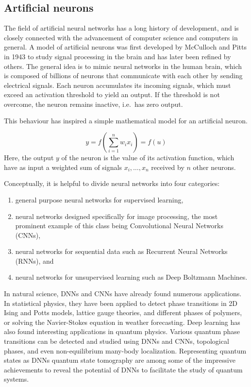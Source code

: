\documentclass[%
oneside,                 %
final,                   %
10pt]{article}
\begin{document}
\subsection*{Artificial neurons}

The field of artificial neural networks has a long history of
development, and is closely connected with the advancement of computer
science and computers in general. A model of artificial neurons was
first developed by McCulloch and Pitts in 1943 to study signal
processing in the brain and has later been refined by others. The
general idea is to mimic neural networks in the human brain, which is
composed of billions of neurons that communicate with each other by
sending electrical signals.  Each neuron accumulates its incoming
signals, which must exceed an activation threshold to yield an
output. If the threshold is not overcome, the neuron remains inactive,
i.e.~has zero output.

This behaviour has inspired a simple mathematical model for an artificial neuron.

\begin{equation}
 y = f\left(\sum_{i=1}^n w_ix_i\right) = f(u)
 \label{artificialNeuron}
\end{equation}
Here, the output $y$ of the neuron is the value of its activation function, which have as input
a weighted sum of signals $x_i, \dots ,x_n$ received by $n$ other neurons.

Conceptually, it is helpful to divide neural networks into four
categories:
\begin{enumerate}
\item general purpose neural networks for supervised learning,

\item neural networks designed specifically for image processing, the most prominent example of this class being Convolutional Neural Networks (CNNs),

\item neural networks for sequential data such as Recurrent Neural Networks (RNNs), and

\item neural networks for unsupervised learning such as Deep Boltzmann Machines.
\end{enumerate}

\noindent
In natural science, DNNs and CNNs have already found numerous
applications. In statistical physics, they have been applied to detect
phase transitions in 2D Ising and Potts models, lattice gauge
theories, and different phases of polymers, or solving the
Navier-Stokes equation in weather forecasting.  Deep learning has also
found interesting applications in quantum physics. Various quantum
phase transitions can be detected and studied using DNNs and CNNs,
topological phases, and even non-equilibrium many-body
localization. Representing quantum states as DNNs quantum state
tomography are among some of the impressive achievements to reveal the
potential of DNNs to facilitate the study of quantum systems.
\end{document}
